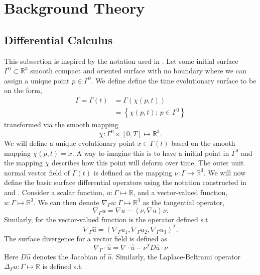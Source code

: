 

\section{Background Theory}%
\label{sec:differential_geometry}


\subsection{Differential Calculus}%
\label{sub:differential_calculus}

This subsection is inspired by the notation used in \cite{kovacs2021convergent, dougan2012first}.
Let some initial surface $\Gamma^{0} \subset \mathbb{R} ^3  $ smooth compact and oriented surface with no boundary where we can assign a unique point $p \in \Gamma ^{0}$. We define define the time evolutionary surface to be on the form,
\[
    \begin{split}
\Gamma  = \Gamma \left( t \right) & = \Gamma \left( \chi \left( p,t \right)  \right) \\
                                  &= \left\{ \chi \left( p,t \right): \ p \in \Gamma^{0}  \right\}
    \end{split}
\]
transformed via the smooth mapping
\[
\chi : \Gamma^{0} \times  \left[ 0,T \right]  \mapsto  \mathbb{R} ^3.
\]
We will define a unique evolutionary point $x \in \Gamma \left( t \right) $ based on the smooth mapping $\chi \left( p,t \right) = x$. A way to imagine this is to have a initial point in $\Gamma ^{0}$ and the mapping $\chi $ describes how this point will deform over time. The outer unit normal vector field of $\Gamma \left( t \right) $ is defined as the mapping $\nu : \Gamma \mapsto
\mathbb{R} ^{3}$. We will now define the basic surface differential operators using the notation constructed in \cite{dougan2012first} and \cite{kovacs2021convergent}.
Consider a scalar function, $u: \Gamma \mapsto \mathbb{R} $, and a vector-valued function, $\hat{u}: \Gamma  \mapsto \mathbb{R} ^3$. We can then denote $ \nabla _{\Gamma } u: \Gamma \mapsto \mathbb{R} ^{3}$ as the tangential operator,
$$
\nabla_{\Gamma
} u  = \nabla u - \left<\nu, \nabla u \right> \nu.
$$
Similarly, for the vector-valued function is the operator defined s.t.
$$\nabla_{\Gamma } \hat{u} = \left( \nabla_{\Gamma } u_{1},\nabla_{\Gamma } u_{2},\nabla_{\Gamma } u_{3}   \right)^{T}.$$ The surface divergence for a vector field is defined as \[
\nabla_{\Gamma } \cdot \hat{u} = \nabla  \cdot \hat{u} - \nu^{T} D \hat{u} \cdot \nu
\]
Here $D\hat{u}$ denotes the Jacobian of $\hat{u}$. Similarly, the Laplace-Beltrami operator $\Delta _{\Gamma }u: \Gamma \mapsto \mathbb{R}$ is defined s.t.
